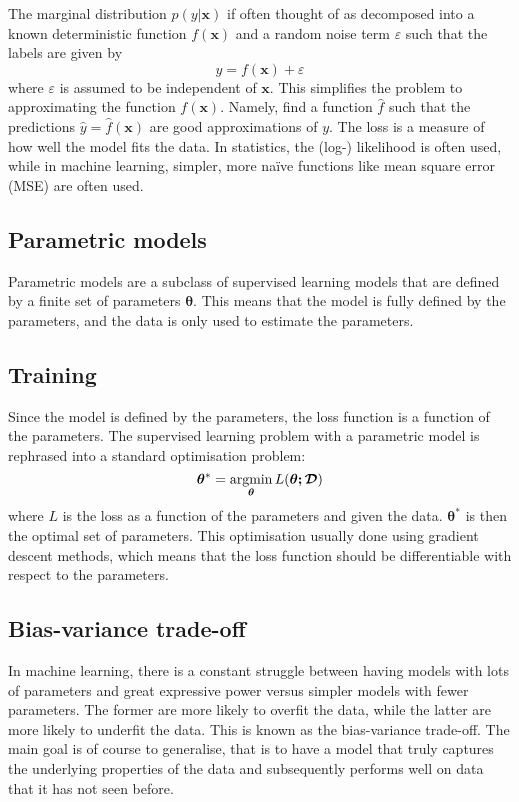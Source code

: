 The marginal distribution $p(y|\bm{x})$ if often thought of as decomposed into a known deterministic function $f(\bm{x})$ and a random noise term $\varepsilon$ such that the labels are given by
\begin{equation}
	y = f(\bm{x}) + \varepsilon
	\label{eq:ml_model}
\end{equation}
where $\varepsilon$ is assumed to be independent of $\bm{x}$.
This simplifies the problem to approximating the function $f(\bm{x})$.
Namely, find a function $\hat{f}$ such that the predictions $\hat{y}=\hat{f}(\bm{x})$ are good approximations of $y$.
The loss is a measure of how well the model fits the data.
In statistics, the (log-) likelihood is often used, while in machine learning, simpler, more naïve functions like mean square error (MSE) are often used.


\subsection{Parametric models}
Parametric models are a subclass of supervised learning models that are defined by a finite set of parameters $\bm{\theta}$.
This means that the model is fully defined by the parameters, and the data is only used to estimate the parameters.

\subsection{Training}
Since the model is defined by the parameters, the loss function is a function of the parameters.
The supervised learning problem with a parametric model is rephrased into a standard optimisation problem:
\begin{equation}
	\bm{\theta}^* = \operatorname*{argmin}_{\bm{\theta}} L(\bm{\theta; \mathcal{D}})
\end{equation}
where $L$ is the loss as a function of the parameters and given the data.
$\bm{\theta}^*$ is then the optimal set of parameters.
This optimisation usually done using gradient descent methods, which means that the loss function should be differentiable with respect to the parameters.


\subsection{Bias-variance trade-off}
In machine learning, there is a constant struggle between having models with lots of parameters and great expressive power versus simpler models with fewer parameters.
The former are more likely to overfit the data, while the latter are more likely to underfit the data.
This is known as the bias-variance trade-off.
The main goal is of course to generalise, that is to have a model that truly captures the underlying properties of the data and subsequently performs well on data that it has not seen before.

